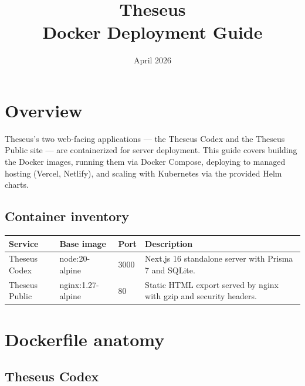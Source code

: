 \documentclass[11pt,letterpaper]{article}
\title{\textbf{Theseus}\\[4pt]\large Docker Deployment Guide}
\date{April 2026}
\author{}
\begin{document}
\maketitle
\thispagestyle{empty}

\tableofcontents
\newpage

\section{Overview}

Theseus's two web-facing applications --- the Theseus Codex and the Theseus Public site --- are containerized for server deployment. This guide covers building the Docker images, running them via Docker Compose, deploying to managed hosting (Vercel, Netlify), and scaling with Kubernetes via the provided Helm charts.

\subsection{Container inventory}

\begin{table}[h]
\small
\begin{tabular}{p{3.5cm} p{2.5cm} p{2cm} p{6cm}}
\toprule
\textbf{Service} & \textbf{Base image} & \textbf{Port} & \textbf{Description} \\
\midrule
Theseus Codex   & node:20-alpine & 3000 & Next.js 16 standalone server with Prisma 7 and SQLite. \\
Theseus Public   & nginx:1.27-alpine & 80 & Static HTML export served by nginx with gzip and security headers. \\
\bottomrule
\end{tabular}
\end{table}

\section{Dockerfile anatomy}

\subsection{Theseus Codex}
\end{document}
